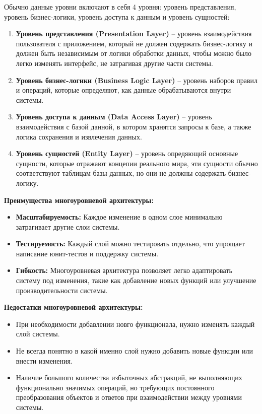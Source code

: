 \documentclass[a4paper,12pt]{report}
\begin{document}
Обычно данные уровни включают в себя 4 уровня: уровень представления, уровень бизнес-логики, уровень доступа к данным и 
уровень сущностей:
\begin{enumerate}
    \item
        \textbf{Уровень представления (Presentation Layer)} -- уровень взаимодействия пользователя с приложением, 
        который не должен содержать бизнес-логику и должен быть независимым от логики обработки данных, 
        чтобы можно было легко изменять интерфейс, не затрагивая другие части системы.
    \item
        \textbf{Уровень бизнес-логики (Business Logic Layer)} -- уровень наборов правил и операций, которые определяют,
        как данные обрабатываются внутри системы.
    \item
        \textbf{Уровень доступа к данным (Data Access Layer)} -- уровень взаимодействия с базой данной, 
        в котором хранятся запросы к базе, а также логика сохранения и извлечения данных.
    \item
        \textbf{Уровень сущностей (Entity Layer)} -- уровень опредяющий основные сущности, которые отражают концепии реального 
        мира, эти сущности обычно соответствуют таблицам базы данных, но они не должны содержать бизнес-логику.
\end{enumerate}

\textbf{Преимущества многоуровневой архитектуры:}
\begin{itemize}
    \item
        \textbf{Масштабируемость:} Каждое изменение в одном слое минимально затрагивает другие слои системы.
    \item
        \textbf{Тестируемость:} Каждый слой можно тестировать отдельно, что упрощает написание юнит-тестов и поддержку системы.
    \item
        \textbf{Гибкость:} Многоуровневая архитектура позволяет легко адаптировать систему под изменения, такие как добавление новых функций или улучшение производительности системы.
\end{itemize}

\textbf{Недостатки многоуровневой архитектуры:}
\begin{itemize}
    \item
        При необходимости добавлении новго функционала, нужно изменять каждый слой системы.
    \item
        Не всегда понятно в какой именно слой нужно добавить новые функции или внести изменения.
    \item
        Наличие большого количества избыточных абстракций, не выполняющих функционально значимых операций, 
        но требующих постоянного преобразования объектов и ответов при взаимодействии между уровнями системы.\cite{design_patterns_architecture}
\end{itemize}
 
\end{document}
